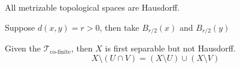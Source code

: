 \begin{example}
All metrizable topological spaces are Hausdorff.

Suppose $d(x,y)=r>0$, then take $B_{r/2}(x)$ and $B_{r/2}(y)$
\end{example}

\begin{example}
Given the $\mathcal{T}_{\text{co-finite}}$, then $X$ is first separable but not Hausdorff.
\[
X\setminus(U\cap V)
=
(X\setminus U)\cup(X\setminus V)
\]
\end{example}

















